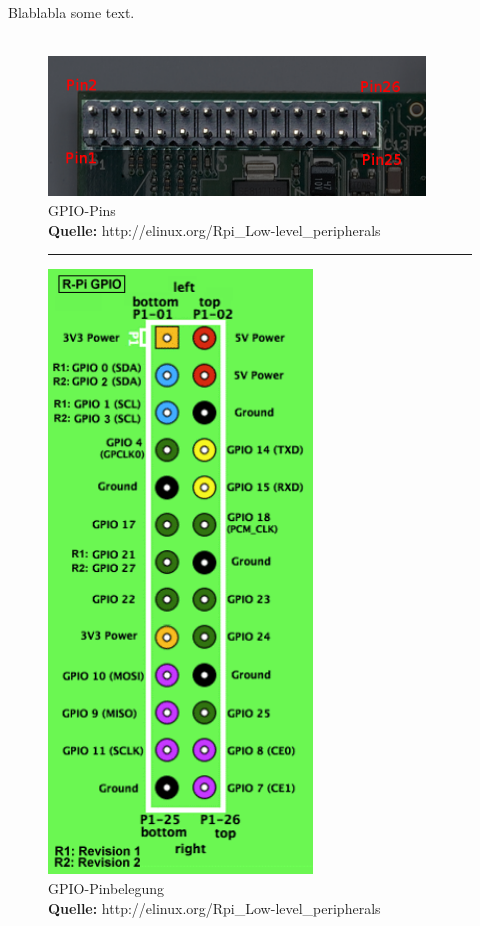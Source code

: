 Blablabla some text.\\
\\
\begin{figure}[H]
\centering
\includegraphics[keepaspectratio=true, width=10cm]{images/rpi/picPins.png}
\caption[GPIO-Pins]{GPIO-Pins\\ \textbf{Quelle:} http://elinux.org/Rpi\_Low-level\_peripherals}
\end{figure}

\begin{figure}[H]
\centering
\rule{1cm}{1cm}
\includegraphics[keepaspectratio=true, width=7cm]{images/rpi/gpio.png}
\caption[GPIO-Pinbelegung]{GPIO-Pinbelegung\\ \textbf{Quelle:} http://elinux.org/Rpi\_Low-level\_peripherals}
\end{figure}